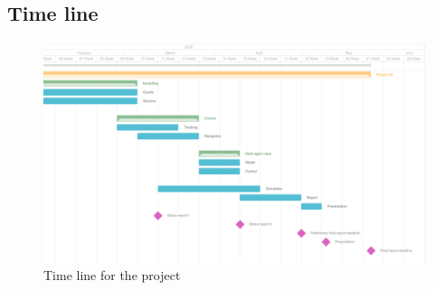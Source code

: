 \documentclass{article}
\begin{document}
	\subsection{Time line}
		\begin{figure}[H]
			\centering
			\includegraphics[width=\linewidth]{img/timeline}
			\caption{Time line for the project}
		\end{figure}
\end{document}
